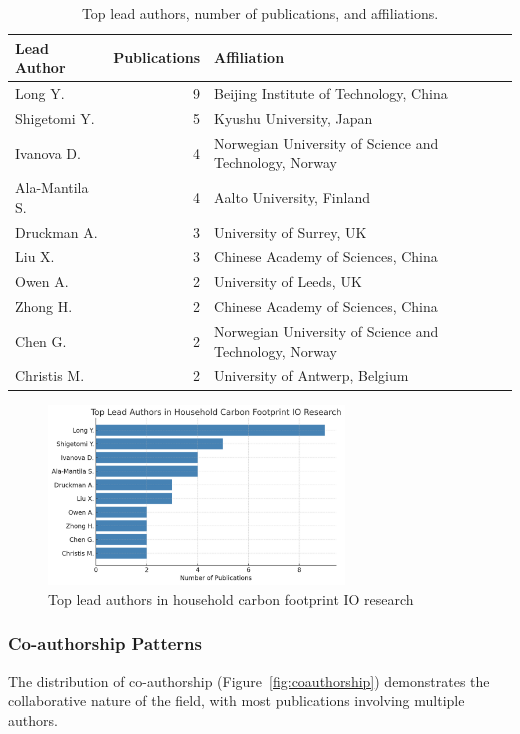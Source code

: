 \documentclass[12pt,a4paper]{article}%
\begin{document}
\begin{table}[h]
\centering
\caption{Top lead authors, number of publications, and affiliations.}
\label{tab:lead_authors_affiliations}
\begin{tabular}{@{}lrl@{}}
\hline
\textbf{Lead Author} & \textbf{Publications} & \textbf{Affiliation} \\
\hline
Long Y. & 9 & Beijing Institute of Technology, China \\
Shigetomi Y. & 5 & Kyushu University, Japan \\
Ivanova D. & 4 & Norwegian University of Science and Technology, Norway \\
Ala-Mantila S. & 4 & Aalto University, Finland \\
Druckman A. & 3 & University of Surrey, UK \\
Liu X. & 3 & Chinese Academy of Sciences, China \\
Owen A. & 2 & University of Leeds, UK \\
Zhong H. & 2 & Chinese Academy of Sciences, China \\
Chen G. & 2 & Norwegian University of Science and Technology, Norway \\
Christis M. & 2 & University of Antwerp, Belgium \\
\hline
\end{tabular}
\end{table}


\begin{figure}[h]
\centering
\includegraphics[width=0.7\textwidth]{Authors.png}
\caption{Top lead authors in household carbon footprint IO research}
\label{fig:lead_authors}
\end{figure}

\subsubsection{Co-authorship Patterns}

The distribution of co-authorship (Figure~\ref{fig:coauthorship}) demonstrates the collaborative nature of the field, with most publications involving multiple authors.
\end{document}
